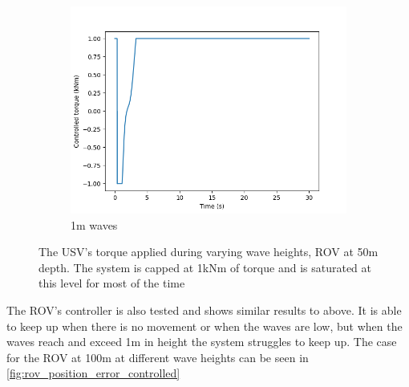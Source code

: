 \documentclass[class=article, crop=false]{standalone}
\begin{document}
\begin{figure}
\begin{subfigure}{0.65\textwidth}
        \includegraphics{scenario1/rov-50m/1.0m/usv_torque}
        \caption{1m waves}
        \label{fig:position_controlled_1m}
    \end{subfigure}
    \vfill
    \caption{The USV's torque applied during varying wave heights, ROV at 50m depth. The system is capped at 1kNm of torque and is saturated at this level for most of the time}
    \label{fig:torque}
\end{figure}

The ROV's controller is also tested and shows similar results to above. It is able to keep up when there is no movement or when the waves are low, but when the waves reach and exceed 1m in height the system struggles to keep up. The case for the ROV at 100m at different wave heights can be seen in \cref{fig:rov_position_error_controlled}
\end{document}
